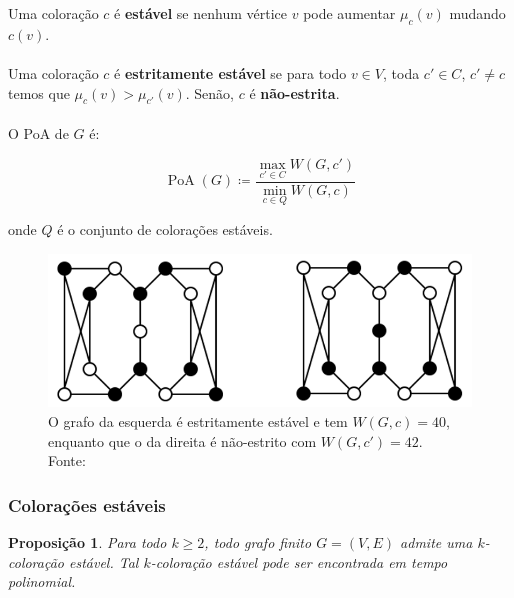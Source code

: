 \documentclass{beamer}
\DeclareMathOperator*{\PoA}{\text{PoA}}
\theoremstyle{plain}
\newtheorem{proposition}{Proposição}
\newcommand{\p}{\pause}
\begin{document}
\begin{frame}
  Uma coloração $c$ é \textbf{estável} se nenhum vértice $v$ pode aumentar $\mu_c(v)$ mudando
  $c(v)$.\p\\~\\

  Uma coloração $c$ é \textbf{estritamente estável} se para todo $v\in V$, toda $c'\in C$, $c'\neq
  c$ temos que $\mu_c(v)>\mu_{c'}(v)$. Senão, $c$ é \textbf{não-estrita}.\p\\~\\

  O PoA de $G$ é:

  \begin{equation*}
    \PoA(G)\coloneqq\frac{\max_{c'\in C} W(G,c')}{\min_{c\in Q} W(G,c)}
  \end{equation*}

  onde $Q$ é o conjunto de colorações estáveis.
\end{frame}

\begin{frame}
  \begin{figure}[h]
    \centering\includegraphics[scale=0.3]{imgs/ex1.png}
    \captionsetup{justification=raggedright}
    \caption{O grafo da esquerda é estritamente estável e tem $W(G,c)=40$, enquanto que o da
    direita é não-estrito com $W(G,c')=42$. Fonte:~\cite{kun-et-al}}
  \end{figure}
\end{frame}

\begin{frame}
  \frametitle{Colorações estáveis}
  \begin{proposition}\label{prop-1} Para todo $k\geq 2$, todo grafo finito $G=(V,E)$ admite uma
    $k$-coloração estável. Tal $k$-coloração estável pode ser encontrada em tempo polinomial.
  \end{proposition}
\end{frame}
\end{document}
